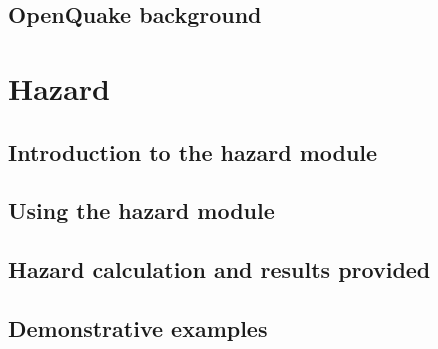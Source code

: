 \documentclass[12pt,a4paper,headings=small,version=first,dvips]{scrbook}
\begin{document}
\chapter{OpenQuake background}
	
%	
\thispagestyle{empty}
\part{Hazard}
\chapter{Introduction to the hazard module}
    \label{chap:oqhazintro}
	
    
    
\chapter{Using the hazard module}
	\label{chap:hazinp}
	
\chapter{Hazard calculation and results provided}
	\label{chap:hazout}
	
\chapter{Demonstrative examples}
	\label{chap:hazdemo}
	
\end{document}
